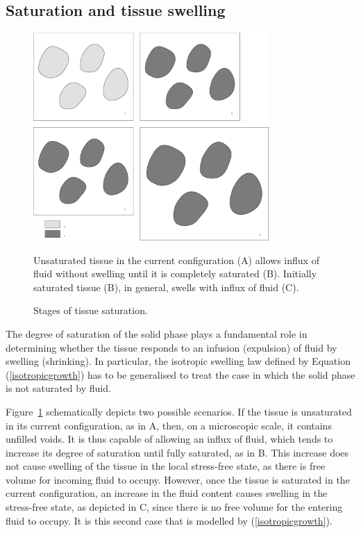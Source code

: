 \subsection{Saturation and tissue swelling}
\label{saturation-and-tissue-swelling}

\begin{figure}[ht]
  \begin{center}
    \includegraphics[width=0.8\textwidth]{images/elucidation/saturation-stages}
    \caption{Stages of tissue saturation.}
    \label{saturation-and-swelling}
  \end{center}
      {Unsaturated tissue in the current configuration (A) allows
        influx of fluid without swelling until it is completely
        saturated (B). Initially saturated tissue (B), in general,
        swells with influx of fluid (C).}
\end{figure}

\noindent The degree of saturation of the solid phase plays a
fundamental role in determining whether the tissue responds to an
infusion (expulsion) of fluid by swelling (shrinking). In particular,
the isotropic swelling law defined by Equation (\ref{isotropicgrowth})
has to be generalised to treat the case in which the solid phase is
not saturated by fluid.

Figure~\ref{saturation-and-swelling} schematically depicts two
possible scenarios. If the tissue is unsaturated in its current
configuration, as in A, then, on a microscopic scale, it contains
unfilled voids. It is thus capable of allowing an influx of fluid,
which tends to increase its degree of saturation until fully
saturated, as in B. This increase does not cause swelling of the
tissue in the local stress-free state, as there is free volume for
incoming fluid to occupy. However, once the tissue is saturated in the
current configuration, an increase in the fluid content causes
swelling in the stress-free state, as depicted in C, since there is no
free volume for the entering fluid to occupy. It is this second case
that is modelled by (\ref{isotropicgrowth}).

